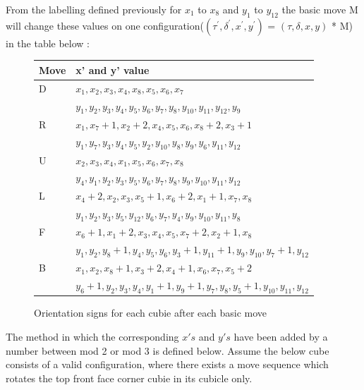 \documentclass{article}
\begin{document}
From the labelling defined previously for $x_{1}$ to $x_{8}$ and $y_{1}$ to $y_{12}$ the basic move M will change these values on one configuration($(\tau^{'} ,\delta^{'} , x^{'} , y^{'} )$ = $(\tau,\delta, x, y)$ * M) in the table below \cite{chengroup}:
\begin{figure}
\begin{center}
    \begin{tabular}{ | l | p{12cm} |}
    \hline
    Move & x' and y' value \\ \hline
    D &  $x_1,x_2,x_3,x_4,x_8,x_5,x_6,x_7$ \\
& $y_1,y_2,y_3,y_4,y_5,y_6,y_7,y_8,y_{10},y_{11},y_{12},y_9$\\ \hline
    R &  $x_1,x_7 +1,x_2 +2,x_4,x_5,x_6,x_8 +2,x_3 +1$\\ & $y_1,y_7,y_3,y_4,y_5,y_2,y_{10},y_{8},y_{9},y_{6},y_{11},y_{12}$\\ \hline
    U &  $x_2,x_3,x_4,x_1,x_5,x_6,x_7,x_8$ \\ & $y_4,y_1,y_2,y_3,y_5,y_6,y_{7},y_{8},y_{9},y_{10},y_{11},y_{12}$\\ \hline
    L & $x_4 +2,x_2,x_3,x_5 + 1,x_6 +2,x_1 + 1,x_7,x_8$ \\
& $y_1,y_2,y_3,y_5,y_12,y_6,y_{7},y_{4},y_{9},y_{10},y_{11},y_{8}$\\ \hline
    F &  $x_6 +1,x_1 +2,x_3,x_4,x_5,x_7 +2,x_2 +1,x_8$\\
& $y_1,y_2,y_8 +1,y_4,y_5,y_6,y_{3}+1,y_{11}+1,y_{9},y_{10},y_{7}+1,y_{12}$\\ \hline
    B &  $x_1,x_2,x_8 +1,x_3 + 2,x_4 + 1,x_6,x_7,x_5 +2$ \\
&$y_6 +1,y_2,y_3,y_4,y_1 +1,y_9 +1,y_{7},y_{8},y_{5}+1,y_{10},y_{11},y_{12}$\\ \hline
    \end{tabular}
\end{center}
\caption{Orientation signs for each cubie after each basic move}
\label{:paritytable}
\end{figure}
The method in which the corresponding $x's$ and $y's$ have been added by a number between mod 2 or mod 3 is defined below. Assume the below cube consists of a valid configuration, where there exists a move sequence which rotates the top front face corner cubie in its cubicle only. 
\end{document}

